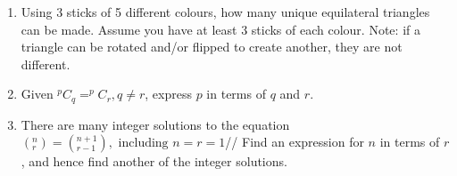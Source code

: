 \documentclass[../main.tex]{subfiles}
\begin{document}
\begin{enumerate}
    \item 
    Using 3 sticks of 5 different colours, how many unique equilateral triangles can be made. Assume you have at least 3 sticks of each colour. Note: if a triangle can be rotated and/or flipped to create another, they are not different.
    \item 
    Given \(^pC_q=^pC_r, q\neq r\), express \(p\) in terms of \(q\) and \(r\).
    \item 
    There are many integer solutions to the equation \((^n_r)=(^{n+1}_{r-1}),\text{ including } n=r=1 \)//
    Find an expression for \(n\) in terms of \(r\), and hence find another of the integer solutions.
\end{enumerate}
\end{document}
